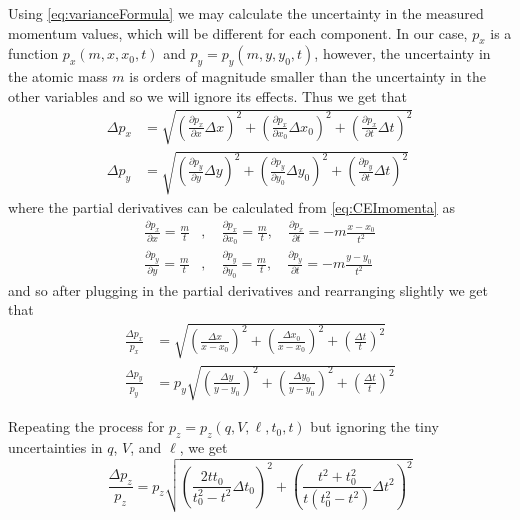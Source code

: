 Using \eqref{eq:varianceFormula} we may calculate the uncertainty in the measured momentum values, which will be different for each component. In our case, $p_x$ is a function $p_x(m,x,x_0,t)$ and $p_y = p_y(m,y,y_0,t)$, however, the uncertainty in the atomic mass $m$ is orders of magnitude smaller than the uncertainty in the other variables and so we will ignore its effects. Thus we get that
\begin{subequations}
  \begin{align}
  \Delta p_x &= \sqrt{
    \left( \frac{\partial p_x}{\partial x}\Delta x \right)^2
    + \left( \frac{\partial p_x}{\partial x_0}\Delta x_0 \right)^2
    + \left(\frac{\partial p_x}{\partial t}\Delta t \right)^2
  } \\
  \Delta p_y &= \sqrt{
    \left( \frac{\partial p_y}{\partial y}\Delta y \right)^2
    + \left(\frac{\partial p_y}{\partial y_0}\Delta y_0 \right)^2
    + \left(\frac{\partial p_y}{\partial t}\Delta t \right)^2
  }
  \end{align}
\end{subequations}
where the partial derivatives can be calculated from \eqref{eq:CEImomenta} as
\begin{subequations}
  \begin{align}
  \frac{\partial p_x}{\partial x} = \frac{m}{t} &,\quad \frac{\partial p_x}{\partial x_0} = \frac{m}{t} ,\quad \frac{\partial p_x}{\partial t} = -m\frac{x-x_0}{t^2}\\
  \frac{\partial p_y}{\partial y} = \frac{m}{t} &,\quad \frac{\partial p_y}{\partial y_0} = \frac{m}{t} ,\quad \frac{\partial p_y}{\partial t} = -m\frac{y-y_0}{t^2}
  \end{align}
\end{subequations}
and so after plugging in the partial derivatives and rearranging slightly we get that
\begin{subequations}
  \begin{align}
  \frac{\Delta p_x}{p_x} &= \sqrt{
    \left( \frac{\Delta x}{x - x_0} \right)^2
    + \left( \frac{\Delta x_0}{x - x_0} \right)^2
    + \left( \frac{\Delta t}{t} \right)^2 } \\
  \frac{\Delta p_y}{p_y} &= p_y \sqrt{
    \left( \frac{\Delta y}{y - y_0} \right)^2
    + \left( \frac{\Delta y_0}{y - y_0} \right)^2
    + \left( \frac{\Delta t}{t} \right)^2 }
  \end{align}
\end{subequations}

Repeating the process for $p_z = p_z(q,V,\ell,t_0,t)$ but ignoring the tiny uncertainties in $q$, $V$, and $\ell$, we get
\begin{equation}
\frac{\Delta p_z}{p_z} = p_z \sqrt{
  \left( \frac{2tt_0}{t_0^2 - t^2} \Delta t_0 \right)^2
  + \left( \frac{t^2 + t_0^2}{t(t_0^2 - t^2)} \Delta t^2 \right)^2
}
\end{equation}

